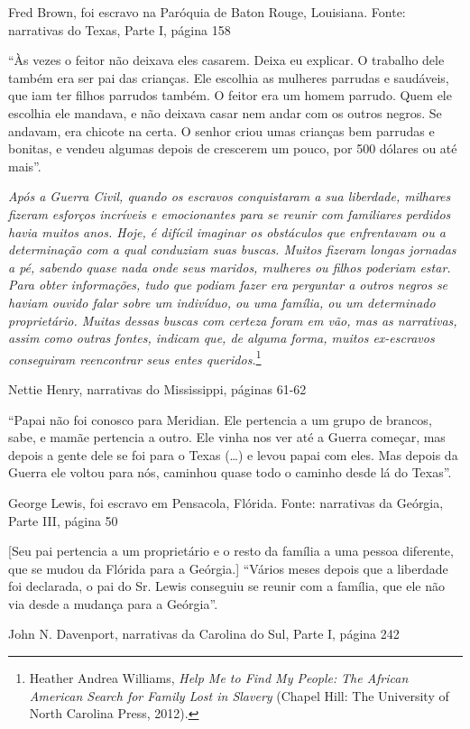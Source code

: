 Fred Brown, foi escravo na Paróquia de Baton Rouge, Louisiana. Fonte:
narrativas do Texas, Parte I, página 158

``Às vezes o feitor não deixava eles casarem. Deixa eu explicar. O
trabalho dele também era ser pai das crianças. Ele escolhia as mulheres
parrudas e saudáveis, que iam ter filhos parrudos também. O feitor era
um homem parrudo. Quem ele escolhia ele mandava, e não deixava casar nem
andar com os outros negros. Se andavam, era chicote na certa. O senhor
criou umas crianças bem parrudas e bonitas, e vendeu algumas depois de
crescerem um pouco, por 500 dólares ou até mais''.

\emph{Após a Guerra Civil, quando os escravos conquistaram a sua
liberdade, milhares fizeram esforços incríveis e emocionantes para se
reunir com familiares perdidos havia muitos anos. Hoje, é difícil
imaginar os obstáculos que enfrentavam ou a determinação com a qual
conduziam suas buscas. Muitos fizeram longas jornadas a pé, sabendo
quase nada onde seus maridos, mulheres ou filhos poderiam estar. Para
obter informações, tudo que podiam fazer era perguntar a outros negros
se haviam ouvido falar sobre um indivíduo, ou uma família, ou um
determinado proprietário. Muitas dessas buscas com certeza foram em vão,
mas as narrativas, assim como outras fontes, indicam que, de alguma
forma, muitos ex-escravos conseguiram reencontrar seus entes
queridos.}\footnote{Heather Andrea Williams, \emph{Help Me to Find My
  People:} \emph{The African American Search for Family Lost in Slavery}
  (Chapel Hill: The University of North Carolina Press, 2012).}

Nettie Henry, narrativas do Mississippi, páginas 61-62

``Papai não foi conosco para Meridian. Ele pertencia a um grupo de
brancos, sabe, e mamãe pertencia a outro. Ele vinha nos ver até a Guerra
começar, mas depois a gente dele se foi para o Texas (\ldots{}) e levou
papai com eles. Mas depois da Guerra ele voltou para nós, caminhou quase
todo o caminho desde lá do Texas''.

George Lewis, foi escravo em Pensacola, Flórida. Fonte: narrativas da
Geórgia, Parte III, página 50

{[}Seu pai pertencia a um proprietário e o resto da família a uma pessoa
diferente, que se mudou da Flórida para a Geórgia.{]} ``Vários meses
depois que a liberdade foi declarada, o pai do Sr. Lewis conseguiu se
reunir com a família, que ele não via desde a mudança para a Geórgia''.

John N. Davenport, narrativas da Carolina do Sul, Parte I, página 242

